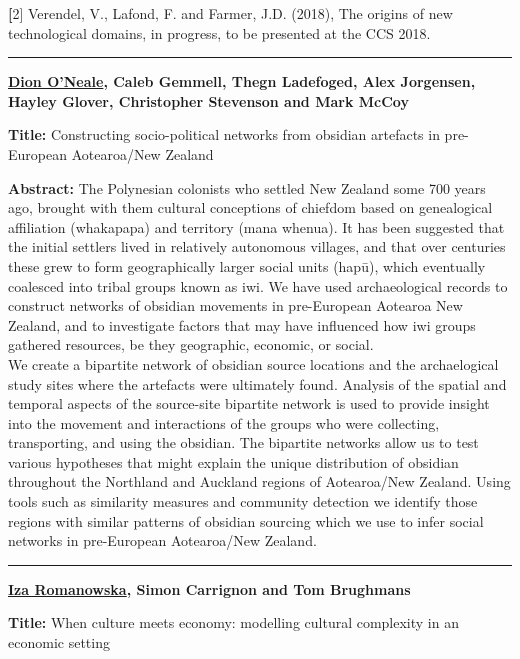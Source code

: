 \documentclass[]{article}
\begin{document}
{\bf [}2{]} Verendel, V., Lafond, F. and Farmer, J.D. (2018), The origins of
new technological domains, in progress, to be presented at the CCS 2018.

\rule{4cm}{.4pt}

{\bf {\href{https://www.physics.auckland.ac.nz/people/done006}{Dion
O'Neale}, Caleb Gemmell, Thegn Ladefoged, Alex Jorgensen, Hayley Glover,
Christopher Stevenson and Mark McCoy}}

\textbf{Title:} Constructing socio-political networks from obsidian
artefacts in pre-European Aotearoa/New Zealand

\textbf{Abstract:} The Polynesian colonists who settled New Zealand some
700 years ago, brought with them cultural conceptions of chiefdom based
on genealogical affiliation (whakapapa) and territory (mana whenua). It
has been suggested that the initial settlers lived in relatively
autonomous villages, and that over centuries these grew to form
geographically larger social units (hapū), which eventually coalesced
into tribal groups known as iwi. We have used archaeological records to
construct networks of obsidian movements in pre-European Aotearoa New
Zealand, and to investigate factors that may have influenced how iwi
groups gathered resources, be they geographic, economic, or social.\\
We create a bipartite network of obsidian source locations and the
archaelogical study sites where the artefacts were ultimately found.
Analysis of the spatial and temporal aspects of the source-site
bipartite network is used to provide insight into the movement and
interactions of the groups who were collecting, transporting, and using
the obsidian. The bipartite networks allow us to test various hypotheses
that might explain the unique distribution of obsidian throughout the
Northland and Auckland regions of Aotearoa/New Zealand. Using tools such
as similarity measures and community detection we identify those regions
with similar patterns of obsidian sourcing which we use to infer social
networks in pre-European Aotearoa/New Zealand.

\rule{4cm}{.4pt}


{\bf {\href{http://www.bsc.es/romanowska-iza}{Iza Romanowska}, Simon
Carrignon and Tom Brughmans}}

\textbf{Title:} When culture meets economy: modelling cultural
complexity in an economic setting
\end{document}
